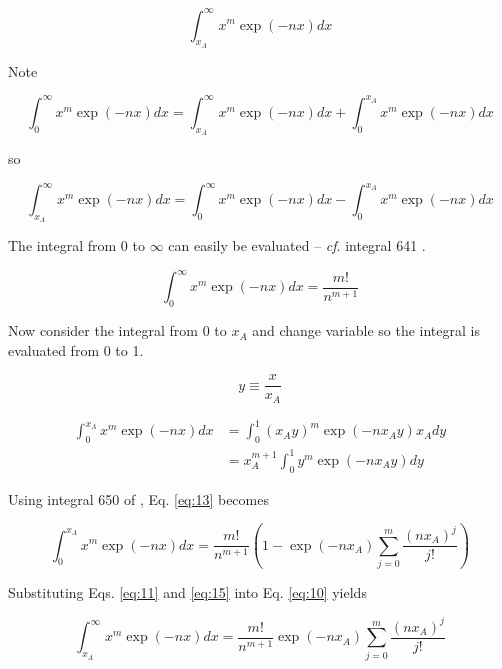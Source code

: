 \documentclass[aip,jap,reprint]{revtex4-1}
\begin{document}
\begin{equation} \label{eq:08}
\int_{x_{A}}^{\infty} x^{m} \exp(-nx) dx
\end{equation}

\noindent Note

\begin{equation} \label{eq:09}
\int_{0}^{\infty} x^{m} \exp(-nx) dx = \int_{x_{A}}^{\infty} x^{m} \exp(-nx) dx + \int_{0}^{x_{A}} x^{m} \exp(-nx) dx
\end{equation}

\noindent so

\begin{equation} \label{eq:10}
\int_{x_{A}}^{\infty} x^{m} \exp(-nx) dx = \int_{0}^{\infty} x^{m} \exp(-nx) dx - \int_{0}^{x_{A}} x^{m} \exp(-nx) dx
\end{equation}

\noindent The integral from 0 to $\infty$ can easily be evaluated -- \emph{cf}. integral 641 \cite{9780849324796}.

\begin{equation} \label{eq:11}
\int_{0}^{\infty} x^{m} \exp(-nx) dx = \frac{m!}{n^{m+1}}
\end{equation}

Now consider the integral from 0 to $x_{A}$ and change variable so the integral is evaluated from 0 to 1.

\begin{equation} \label{eq:12}
y \equiv \frac{x}{x_{A}}
\end{equation}

\begin{align} \label{eq:13}
\int_{0}^{x_{A}} x^{m} \exp(-nx) dx &= \int_{0}^{1} (x_{A}y)^{m} \exp(-nx_{A}y) x_{A} dy \nonumber \\
 &= x_{A}^{m+1} \int_{0}^{1} y^{m} \exp(-nx_{A}y) dy
\end{align}

\noindent Using integral 650 of \cite{9780849324796}, Eq. \ref{eq:13} becomes

\begin{equation} \label{eq:15}
\int_{0}^{x_{A}} x^{m} \exp(-nx) dx = \frac{m!}{n^{m+1}} \left(1 - \exp(-n x_{A}) \sum_{j = 0}^{m} \frac{(n x_{A})^{j}}{j!} \right) 
\end{equation}

Substituting Eqs. \ref{eq:11} and \ref{eq:15} into Eq. \ref{eq:10} yields

\begin{equation} \label{eq:31}
\int_{x_{A}}^{\infty} x^{m} \exp(-nx) dx = \frac{m!}{n^{m+1}} \exp(-n x_{A}) \sum_{j = 0}^{m} \frac{(n x_{A})^{j}}{j!}
\end{equation}
\end{document}
